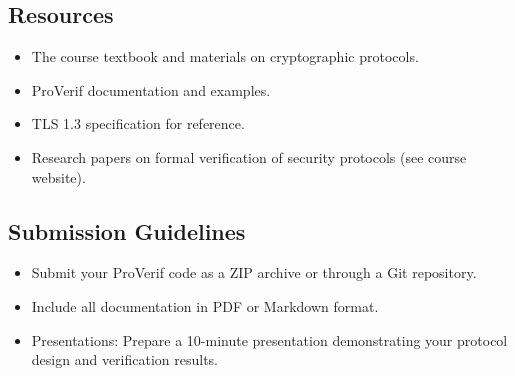 \documentclass[10pt,a4paper,american]{article}
\begin{document}
\subsection*{Resources}
\begin{itemize}
	\item The course textbook and materials on cryptographic protocols.
	\item ProVerif documentation and examples.
	\item TLS 1.3 specification for reference.
	\item Research papers on formal verification of security protocols (see course website).
\end{itemize}

\subsection*{Submission Guidelines}
\begin{itemize}
	\item Submit your ProVerif code as a ZIP archive or through a Git repository.
	\item Include all documentation in PDF or Markdown format.
	\item Presentations: Prepare a 10-minute presentation demonstrating your protocol design and verification results.
\end{itemize}
\end{document}
